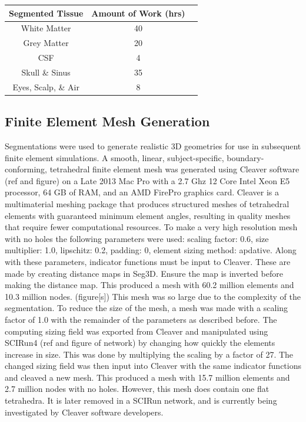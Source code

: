 \begin{center}
\begin{tabular}{ |c|c|c| } 
 \hline
 Segmented Tissue & Amount of Work (hrs) \\ 
 \hline \hline
 White Matter & 40 \\ 
 \hline
Grey Matter & 20 \\ 
 \hline
 CSF & 4\\
 \hline
 Skull \& Sinus & 35\\
 \hline
 Eyes, Scalp, \& Air & 8\\
 \hline
\end{tabular}
\end{center}

\subsection{Finite Element Mesh Generation}
\label{sec:mesh}


Segmentations were used to generate realistic 3D geometries for use in subsequent finite element simulations. A smooth, linear, subject-specific, boundary-conforming, tetrahedral finite element mesh was generated using Cleaver software (ref and figure) on a Late 2013 Mac Pro with a 2.7 Ghz 12 Core Intel Xeon E5 processor, 64 GB of RAM, and an AMD FirePro graphics card. Cleaver is a multimaterial meshing package that produces structured meshes of tetrahedral elements with guaranteed minimum element angles, resulting in quality meshes that require fewer computational resources.  To make a very high resolution mesh with no holes the following parameters were used: scaling factor: 0.6, size multiplier: 1.0, lipschitz: 0.2, padding: 0, element sizing method: apdative. Along with these parameters, indicator functions must be input to Cleaver. These are made by creating distance maps in Seg3D. Ensure the map is inverted before making the distance map. This produced a mesh with 60.2 million elements and 10.3 million nodes. (figure[s]) This mesh was so large due to the complexity of the segmentation. To reduce the size of the mesh, a mesh was made with a scaling factor of 1.0 with the remainder of the parameters as described before. The computing sizing field was exported from Cleaver and manipulated using SCIRun4 (ref and figure of network) by changing how quickly the elements increase in size. This was done by multiplying the scaling by a factor of 27. The changed sizing field was then input into Cleaver with the same indicator functions and cleaved a new mesh. This produced a mesh with 15.7 million elements and 2.7 million nodes with no holes. However, this mesh does contain one flat tetrahedra. It is later removed in a SCIRun network, and is currently being investigated by Cleaver software developers. 

